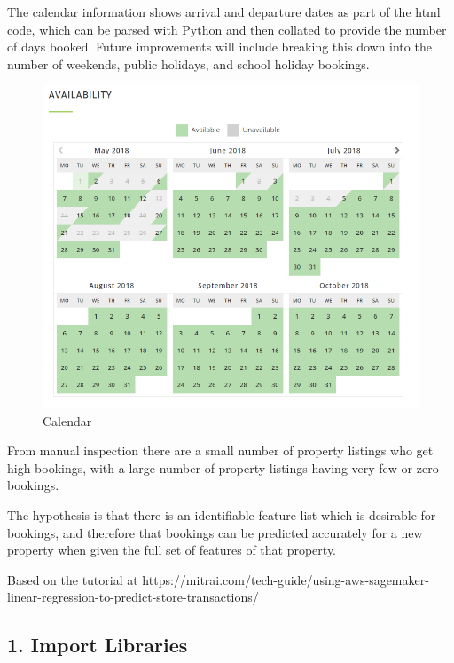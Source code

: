 \documentclass[11pt]{article}
\makeatletter
\def\maxwidth{\ifdim\Gin@nat@width>\linewidth\linewidth
    \else\Gin@nat@width\fi}
\let\Oldincludegraphics\includegraphics
\renewcommand{\includegraphics}[1]{\Oldincludegraphics[width=.8\maxwidth]{#1}}
\makeatother
\begin{document}
The calendar information shows arrival and departure dates as part of
the html code, which can be parsed with Python and then collated to
provide the number of days booked. Future improvements will include
breaking this down into the number of weekends, public holidays, and
school holiday bookings.

\begin{figure}
\centering
\includegraphics{Airbnb_Calendar.PNG}
\caption{Calendar}
\end{figure}

From manual inspection there are a small number of property listings who
get high bookings, with a large number of property listings having very
few or zero bookings.

The hypothesis is that there is an identifiable feature list which is
desirable for bookings, and therefore that bookings can be predicted
accurately for a new property when given the full set of features of
that property.

Based on the tutorial at
https://mitrai.com/tech-guide/using-aws-sagemaker-linear-regression-to-predict-store-transactions/

    \subsection{1. Import Libraries}\label{import-libraries}
\end{document}
